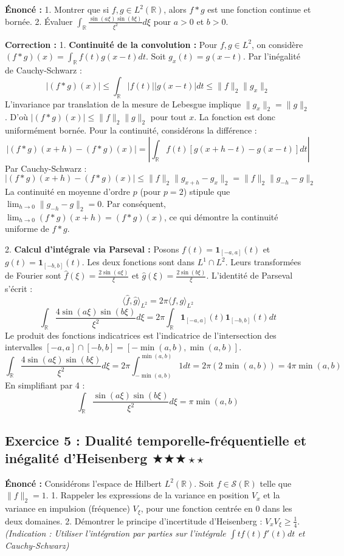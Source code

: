\documentclass[11pt,a4paper]{article}
\begin{document}
\textbf{Énoncé :}
1. Montrer que si $f, g \in L^2(\mathbb{R})$, alors $f * g$ est une fonction continue et bornée.
2. Évaluer $\int_{\mathbb{R}} \frac{\sin(a\xi)\sin(b\xi)}{\xi^2} d\xi$ pour $a > 0$ et $b > 0$.

\textbf{Correction :}
1. \textbf{Continuité de la convolution :}
Pour $f, g \in L^2$, on considère $(f * g)(x) = \int_{\mathbb{R}} f(t) g(x-t) dt$.
Soit $g_x(t) = g(x-t)$. Par l'inégalité de Cauchy-Schwarz :
$$ |(f * g)(x)| \le \int_{\mathbb{R}} |f(t)| |g(x-t)| dt \le \|f\|_2 \|g_x\|_2 $$
L'invariance par translation de la mesure de Lebesgue implique $\|g_x\|_2 = \|g\|_2$.
D'où $|(f * g)(x)| \le \|f\|_2 \|g\|_2$ pour tout $x$. La fonction est donc uniformément bornée.
Pour la continuité, considérons la différence :
$$ |(f * g)(x+h) - (f * g)(x)| = \left| \int_{\mathbb{R}} f(t) [g(x+h-t) - g(x-t)] dt \right| $$
Par Cauchy-Schwarz :
$$ |(f * g)(x+h) - (f * g)(x)| \le \|f\|_2 \|g_{x+h} - g_x\|_2 = \|f\|_2 \|g_{-h} - g\|_2 $$
La continuité en moyenne d'ordre $p$ (pour $p=2$) stipule que $\lim_{h \to 0} \|g_{-h} - g\|_2 = 0$.
Par conséquent, $\lim_{h \to 0} (f * g)(x+h) = (f * g)(x)$, ce qui démontre la continuité uniforme de $f * g$.

2. \textbf{Calcul d'intégrale via Parseval :}
Posons $f(t) = \mathbf{1}_{[-a, a]}(t)$ et $g(t) = \mathbf{1}_{[-b, b]}(t)$. Les deux fonctions sont dans $L^1 \cap L^2$.
Leurs transformées de Fourier sont $\hat{f}(\xi) = \frac{2\sin(a\xi)}{\xi}$ et $\hat{g}(\xi) = \frac{2\sin(b\xi)}{\xi}$.
L'identité de Parseval s'écrit :
$$ \langle \hat{f}, \hat{g} \rangle_{L^2} = 2\pi \langle f, g \rangle_{L^2} $$
$$ \int_{\mathbb{R}} \frac{4\sin(a\xi)\sin(b\xi)}{\xi^2} d\xi = 2\pi \int_{\mathbb{R}} \mathbf{1}_{[-a, a]}(t) \mathbf{1}_{[-b, b]}(t) dt $$
Le produit des fonctions indicatrices est l'indicatrice de l'intersection des intervalles $[-a, a] \cap [-b, b] = [-\min(a,b), \min(a,b)]$.
$$ \int_{\mathbb{R}} \frac{4\sin(a\xi)\sin(b\xi)}{\xi^2} d\xi = 2\pi \int_{-\min(a,b)}^{\min(a,b)} 1 dt = 2\pi (2\min(a,b)) = 4\pi\min(a,b) $$
En simplifiant par 4 :
$$ \int_{\mathbb{R}} \frac{\sin(a\xi)\sin(b\xi)}{\xi^2} d\xi = \pi \min(a,b) $$



\subsection*{Exercice 5 : Dualité temporelle-fréquentielle et inégalité d'Heisenberg \quad $\bigstar\bigstar\bigstar\star\star$}

\textbf{Énoncé :}
Considérons l'espace de Hilbert $L^2(\mathbb{R})$. Soit $f \in \mathcal{S}(\mathbb{R})$ telle que $\|f\|_2 = 1$.
1. Rappeler les expressions de la variance en position $V_x$ et la variance en impulsion (fréquence) $V_\xi$, pour une fonction centrée en $0$ dans les deux domaines.
2. Démontrer le principe d'incertitude d'Heisenberg : $V_x V_\xi \ge \frac{1}{4}$.
\textit{(Indication : Utiliser l'intégration par parties sur l'intégrale $\int t f(t) f'(t) dt$ et Cauchy-Schwarz)}
\end{document}
